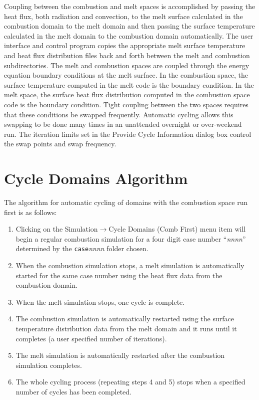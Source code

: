 \documentclass[12pt]{article}
\newcommand{\cfile}[2]{\texttt{#1}\textit{nnnn}\texttt{#2}}
\newcommand{\smenu}[2]{\textsf{#1$\to$#2}}
\newcommand{\dialog}[1]{\textsf{#1}}
\numberwithin{equation}{section}
\begin{document}
Coupling between the combustion and melt spaces is accomplished by passing the heat flux, both radiation and convection, to the melt surface calculated in the combustion domain to the melt domain and then passing the surface temperature calculated in the melt domain to the combustion domain automatically. The user interface and control program copies the appropriate melt surface temperature and heat flux distribution files back and forth between the melt and combustion subdirectories. The melt and combustion spaces are coupled through the energy equation boundary conditions at the melt surface. In the combustion space, the surface temperature computed in the melt code is the boundary condition. In the melt space, the surface heat flux distribution computed in the combustion space code is the boundary condition. Tight coupling between the two spaces requires that these conditions be swapped frequently. Automatic cycling allows this swapping to be done many times in an unattended overnight or over-weekend run. The iteration limits set in the \dialog{Provide Cycle Information} dialog box control the swap points and swap frequency.

\section{Cycle Domains Algorithm}
\label{sec:cda}

The algorithm for automatic cycling of domains with the combustion space run first is as follows:

\noindent
\begin{enumerate}
	\item Clicking on the \smenu{Simulation}{Cycle Domains (Comb First)} menu item will begin a regular combustion simulation for a four digit case number ``\textit{nnnn}'' determined by the \cfile{case}{} folder chosen.
	\item When the combustion simulation stops, a melt simulation is automatically started for the same case number using the heat flux data from the combustion domain.
	\item  When the melt simulation stops, one cycle is complete.
	\item  The combustion simulation is automatically restarted using the surface temperature distribution data from the melt domain and it runs until it completes (a user specified number of iterations).
	\item  The melt simulation is automatically restarted after the combustion simulation completes.
	\item  The whole cycling process (repeating steps 4 and 5) stops when a specified number of cycles has been completed.
\end{enumerate}
\end{document}
